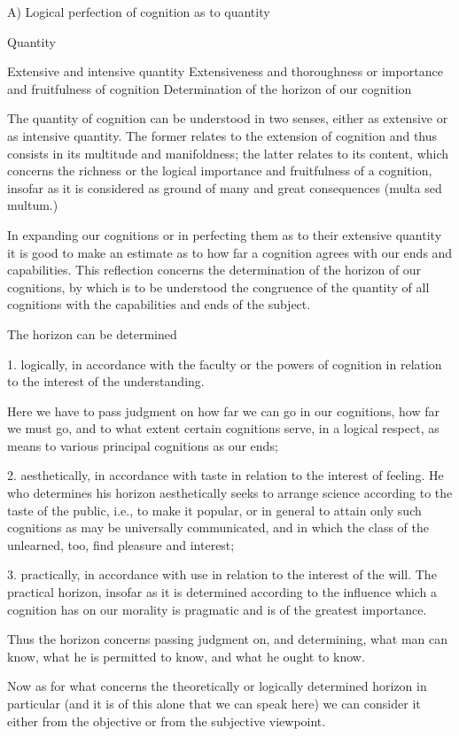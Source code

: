 A) Logical perfection of cognition as to quantity

Quantity

    Extensive and intensive quantity
    Extensiveness and thoroughness
    or importance and fruitfulness of cognition
    Determination of the horizon of our cognition

The quantity of cognition can be understood in two senses,
either as extensive or as intensive quantity.
The former relates to the extension of cognition and
thus consists in its multitude and manifoldness;
the latter relates to its content, which concerns the richness
or the logical importance and fruitfulness of a cognition,
insofar as it is considered as ground of
many and great consequences (multa sed multum.)

In expanding our cognitions or in perfecting them
as to their extensive quantity
it is good to make an estimate as to how far
a cognition agrees with our ends and capabilities.
This reflection concerns the determination of
the horizon of our cognitions,
by which is to be understood
the congruence of the quantity of all cognitions
with the capabilities and ends of the subject.

The horizon can be determined

1. logically, in accordance with the faculty or the powers of
cognition in relation to the interest of the understanding.

Here we have to pass judgment on how far we can go in our cognitions,
how far we must go, and to what extent certain cognitions serve,
in a logical respect, as means to various principal cognitions as our ends;

2. aesthetically, in accordance with taste
in relation to the interest of feeling.
He who determines his horizon aesthetically seeks
to arrange science according to the taste of the public,
i.e., to make it popular,
or in general to attain only such cognitions
as may be universally communicated,
and in which the class of the unlearned, too,
find pleasure and interest;

3. practically, in accordance with use
in relation to the interest of the will.
The practical horizon, insofar as it is determined
according to the influence which a cognition has
on our morality is pragmatic
and is of the greatest importance.

Thus the horizon concerns passing judgment on,
and determining,
what man can know,
what he is permitted to know,
and what he ought to know.

Now as for what concerns the theoretically
or logically determined horizon in particular
(and it is of this alone that we can speak here)
we can consider it either from the objective
or from the subjective viewpoint.

